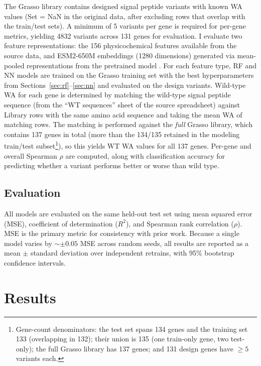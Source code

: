 \documentclass[12pt]{article}
\begin{document}
The Grasso library contains designed signal peptide variants with known WA values (Set = NaN in the original data, after excluding rows that overlap with the train/test sets).
A minimum of 5 variants per gene is required for per-gene metrics, yielding 4832 variants across 131 genes for evaluation.
I evaluate two feature representations: the 156 physicochemical features available from the source data, and ESM2-650M embeddings (1280 dimensions) generated via mean-pooled representations from the pretrained model \citep{lin2023}.
For each feature type, RF and NN models are trained on the Grasso training set with the best hyperparameters from Sections~\ref{sec:rf}--\ref{sec:nn} and evaluated on the design variants.
Wild-type WA for each gene is determined by matching the wild-type signal peptide sequence (from the ``WT sequences'' sheet of the source spreadsheet) against Library rows with the same amino acid sequence and taking the mean WA of matching rows. The matching is performed against the \emph{full} Grasso library, which contains 137 genes in total (more than the 134/135 retained in the modeling train/test subset\footnote{Gene-count denominators: the test set spans 134 genes and the training set 133 (overlapping in 132); their union is 135 (one train-only gene, two test-only); the full Grasso library has 137 genes; and 131 design genes have $\geq 5$ variants each.}), so this yields WT WA values for all 137 genes.
Per-gene and overall Spearman $\rho$ are computed, along with classification accuracy for predicting whether a variant performs better or worse than wild type.

\subsection{Evaluation}
\label{sec:metrics}

All models are evaluated on the same held-out test set using mean squared error (MSE), coefficient of determination ($R^2$), and Spearman rank correlation ($\rho$).
MSE is the primary metric for consistency with prior work. Because a single model varies by ${\sim}{\pm}0.05$ MSE across random seeds, all results are reported as a mean $\pm$ standard deviation over independent retrains, with 95\% bootstrap confidence intervals.

\section{Results}
\label{sec:results}
\end{document}
